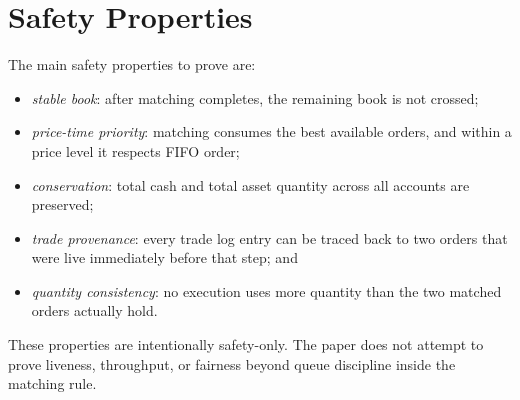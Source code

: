 \section{Safety Properties}

The main safety properties to prove are:

\begin{itemize}[leftmargin=1.5em]
\item \emph{stable book}: after matching completes, the remaining book is not
crossed;
\item \emph{price-time priority}: matching consumes the best available orders,
and within a price level it respects FIFO order;
\item \emph{conservation}: total cash and total asset quantity across all
accounts are preserved;
\item \emph{trade provenance}: every trade log entry can be traced back to two
orders that were live immediately before that step; and
\item \emph{quantity consistency}: no execution uses more quantity than the two
matched orders actually hold.
\end{itemize}

These properties are intentionally safety-only. The paper does not attempt to
prove liveness, throughput, or fairness beyond queue discipline inside the
matching rule.

